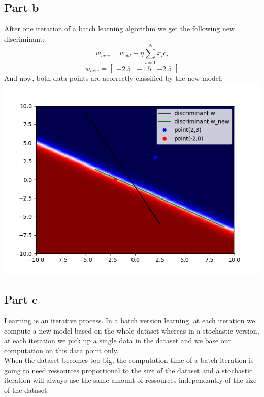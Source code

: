 \documentclass[a4paper, 10pt]{article}
\begin{document}
\subsection{Part b}
After one iteration of a batch learning algorithm we get the following new discriminant:
$$
w_{new} = w_{old} + \eta\sum_{i=1}^N x_ic_i
$$
$$
w_{new} = \begin{bmatrix}-2.5 & -1.5 & -2.5\end{bmatrix}
$$
And now, both data points are acorrectly classified by the new model:
\\
\includegraphics[scale=0.6]{ex1_b.png}

\subsection{Part c}
Learning is an iterative process. In a batch version learning, at each iteration we compute a new model
based on the whole dataset whereas in a stochastic version, at each iteration we pick up a single data in the dataset
and we base our computation on this data point only.
\\
When the dataset becomes too big, the computation time of a batch iteration is going to need ressources 
proportional to the size of the dataset and a stochastic iteration will always use the same amount of ressources
independantly of the size of the dataset.
\end{document}
